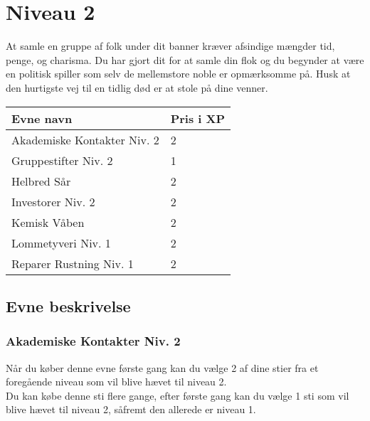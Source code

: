 \chapter*{Niveau 2}
At samle en gruppe af folk under dit banner kræver afsindige mængder tid, penge, og charisma. Du har gjort dit for at samle din flok og du begynder at være en politisk spiller som selv de mellemstore noble er opmærksomme på. Husk at den hurtigste vej til en tidlig død er at stole på dine venner.

\begin{table}[H]
    \centering
    \begin{tabular}{|p{}|p{}|}
    \rowcolor{cerulean!80}\hline
        Evne navn & Pris i XP \\\hline         
         Akademiske Kontakter Niv. 2 & 2 \\\hline
         Gruppestifter Niv. 2 & 1 \\\hline
         Helbred Sår & 2 \\\hline
         Investorer Niv. 2 & 2 \\\hline
         Kemisk Våben & 2 \\\hline
         Lommetyveri Niv. 1 & 2 \\\hline
         Reparer Rustning Niv. 1 & 2 \\\hline
    \end{tabular}
\end{table}
\section*{Evne beskrivelse}

\subsection*{Akademiske Kontakter Niv. 2}

Når du køber denne evne første gang kan du vælge 2 af dine stier fra et foregående niveau som vil blive hævet til niveau 2.\\
Du kan købe denne sti flere gange, efter første gang kan du vælge 1 sti som vil blive hævet til niveau 2, såfremt den allerede er niveau 1. \\

